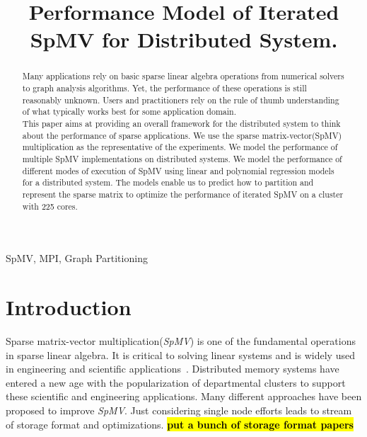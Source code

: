 \documentclass[conference, 10ppt]{IEEEtran}
\begin{document}
%
\newcommand{\todo}[1]{\color{red}\textbf{\hl{#1}}\color{black}\xspace}
\newcommand{\rom}[1]{\expandafter{\romannumeral #1\relax}}
%
\title{Performance Model of Iterated SpMV for Distributed System.}

\author{
\and
{}
}
%
\maketitle

\begin{abstract}
Many applications rely on basic sparse linear algebra operations from numerical solvers to graph analysis 
algorithms. Yet, the performance of these operations is still reasonably unknown. Users and practitioners 
rely on the rule of thumb understanding of what typically works best for some application domain.
\\ 
This paper aims at providing an overall framework for the distributed system to think about the performance 
of sparse applications. We use the sparse matrix-vector(SpMV) multiplication as the representative of the 
experiments. We model the performance of multiple SpMV implementations on distributed systems. 
 We model the performance of different modes of execution of SpMV using linear and polynomial regression models for a distributed system. 
 The models enable us to predict how to partition and represent the sparse matrix to optimize the performance of iterated SpMV on a cluster with 225 cores.
\end{abstract}
%

\begin{IEEEkeywords}
SpMV, MPI, Graph Partitioning
\end{IEEEkeywords}

\section{Introduction}
Sparse matrix-vector multiplication(\textit{SpMV}) is one of the
fundamental operations in sparse linear algebra. It is critical to
solving linear systems and is widely used in engineering and
scientific applications~\cite{gleich2015pagerank, saad2003iterative,
  dytrych2016efficacy}.  Distributed memory systems have entered a new
age with the popularization of departmental clusters to support these
scientific and engineering applications.  Many different approaches
have been proposed to improve \textit{SpMV}. Just considering single
node efforts leads to stream of storage format and optimizations. \todo{put a bunch of storage format papers}
\end{document}

